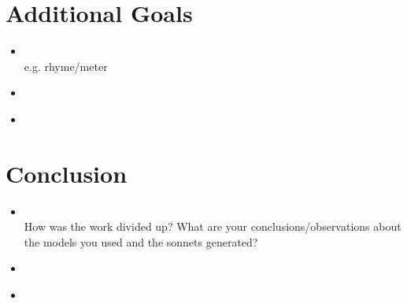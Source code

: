\section{Additional Goals}
\medskip
\begin{itemize}


    \item {} \\

        e.g. rhyme/meter

    \item {} \\

    \item {} \\

\end{itemize}



\section{Conclusion}
\medskip
\begin{itemize}

    \item {} \\

        How was the work divided up?
What are your conclusions/observations about the models you used and the sonnets generated?


    \item {} \\

    \item {} \\

\end{itemize}



